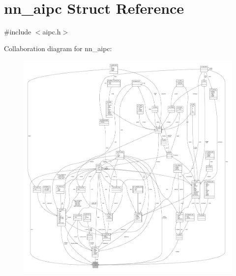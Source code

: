 \hypertarget{structnn__aipc}{}\section{nn\+\_\+aipc Struct Reference}
\label{structnn__aipc}


{\ttfamily \#include $<$aipc.\+h$>$}



Collaboration diagram for nn\+\_\+aipc\+:\nopagebreak
\begin{figure}[H]
\begin{center}
\leavevmode
\includegraphics[width=350pt]{structnn__aipc__coll__graph}
\end{center}
\end{figure}
